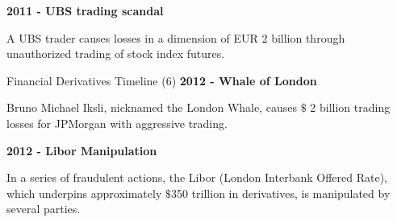 \textbf{2011 - UBS trading scandal}


	A UBS trader causes losses in a dimension of EUR 2 billion through unauthorized trading of stock index futures.


{Financial Derivatives Timeline (6)}
\textbf{2012 - Whale of London}


	Bruno Michael Iksli, nicknamed the London Whale, causes $\$$ 2 billion trading losses for JPMorgan with aggressive trading.


\textbf{2012 - Libor Manipulation}


	In a series of fraudulent actions, the Libor (London Interbank Offered Rate), which underpins approximately $\$$350 trillion in derivatives, is manipulated by several parties.

